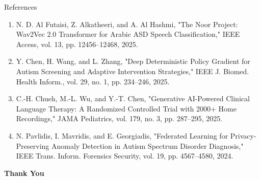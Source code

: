 \documentclass[aspectratio=169, 11pt]{beamer}
\begin{document}
\begin{frame}[allowframebreaks]{References}
\begin{enumerate}
        \item N. D. Al Futaisi, Z. Alkatheeri, and A. Al Hashmi, "The Noor Project: Wav2Vec 2.0 Transformer for Arabic ASD Speech Classification," IEEE Access, vol. 13, pp. 12456–12468, 2025.
        \item Y. Chen, H. Wang, and L. Zhang, "Deep Deterministic Policy Gradient for Autism Screening and Adaptive Intervention Strategies," IEEE J. Biomed. Health Inform., vol. 29, no. 1, pp. 234–246, 2025.
        \item C.-H. Chueh, M.-L. Wu, and Y.-T. Chen, "Generative AI-Powered Clinical Language Therapy: A Randomized Controlled Trial with 2000+ Home Recordings," JAMA Pediatrics, vol. 179, no. 3, pp. 287–295, 2025.
        \item N. Pavlidis, I. Mavridis, and E. Georgiadis, "Federated Learning for Privacy-Preserving Anomaly Detection in Autism Spectrum Disorder Diagnosis," IEEE Trans. Inform. Forensics Security, vol. 19, pp. 4567–4580, 2024.
    \end{enumerate}
\end{frame}

\begin{frame}
    \centering    
    {\Huge \textbf{\textcolor{amritaMaroon}{Thank You}}}
\end{frame}
\end{document}
